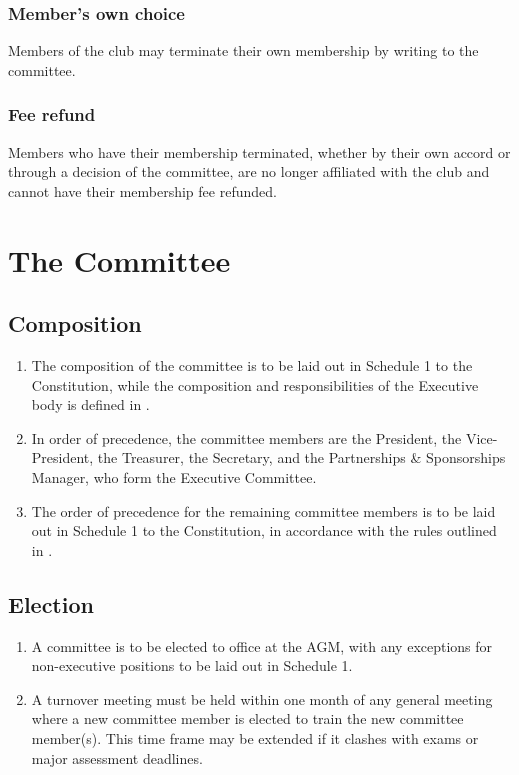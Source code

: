 \documentclass{constitution}
\begin{document}
\subsubsection{Member's own choice}
Members of the club may terminate their own membership by writing to the committee.

\subsubsection{Fee refund}
Members who have their membership terminated, whether by their own accord or through a decision of the committee, are no longer affiliated with the club and cannot have their membership fee refunded.


\section{The Committee}\label{theCommittee}

\subsection{Composition}\label{committeeComp}
\begin{enumerate}[(1)]
    \item The composition of the committee is to be laid out in Schedule 1 to the Constitution, while the composition and responsibilities of the Executive body is defined in .
    \item In order of precedence, the committee members are the President, the Vice-President, the Treasurer, the Secretary, and the Partnerships \& Sponsorships Manager, who form the Executive Committee.
    \item The order of precedence for the remaining committee members is to be laid out in Schedule 1 to the Constitution, in accordance with the rules outlined in .
\end{enumerate}

\subsection{Election}
\begin{enumerate}[(1)]
    \item A committee is to be elected to office at the AGM, with any exceptions for non-executive positions to be laid out in Schedule 1.
    \item A turnover meeting must be held within one month of any general meeting where a new committee member is elected to train the new committee member(s). This time frame may be extended if it clashes with exams or major assessment deadlines.
\end{enumerate}
\end{document}
